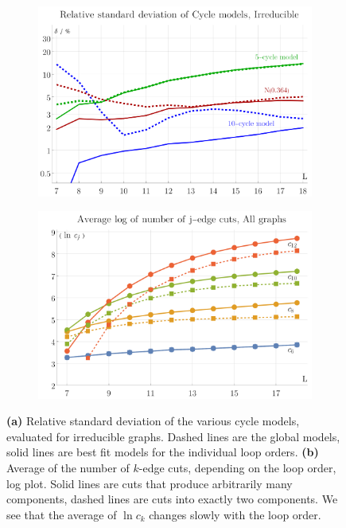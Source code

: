 \documentclass[11pt]{scrartcl}
\numberwithin{equation}{section}
\begin{document}
\begin{figure}[htb]
	\begin{subfigure}{ .49 \linewidth}
		\centering
		\includegraphics[width=\linewidth]{figures/cycle_models_relative_standard_deviation}
		\subcaption{}
		\label{fig:cycle_models_relative_standard_deviation}
	\end{subfigure}
	\begin{subfigure}{ .49 \linewidth}
		\centering
		\includegraphics[width=\linewidth]{figures/cut_averages}
		\subcaption{}
		\label{fig:cut_averages}
	\end{subfigure}
	
	
	\caption{\textbf{(a)} Relative standard deviation of the various cycle models, evaluated for irreducible graphs. Dashed lines are the global models, solid lines are best fit models for the individual loop orders. 
		\textbf{(b)}  Average of the number of $k$-edge cuts, depending on the loop order, log plot. Solid lines are cuts that produce arbitrarily many components, dashed lines are cuts into exactly two components. We see that the average of $  \ln   c_k    $ changes slowly with the loop order.
	}
	
\end{figure}
\end{document}
